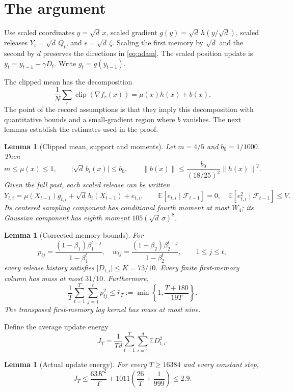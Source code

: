 \documentclass[11pt]{article}
\newtheorem{lemma}[theorem]{Lemma}
\newcommand{\E}{\mathbb E}
\newcommand{\norm}[1]{\left\|#1\right\|}
\newcommand{\clip}{\operatorname{clip}}
\begin{document}
\section{The argument}
Use scaled coordinates $y=\sqrt d\,x$, scaled gradient
$g(y)=\sqrt d\,h(y/\sqrt d)$, scaled releases $Y_t=\sqrt d\,Q_t$, and
$\epsilon=\sqrt d\,\zeta$. Scaling the first memory by $\sqrt d$ and the
second by $d$ preserves the directions in \eqref{eq:adam}.
The scaled position update is $y_t=y_{t-1}-\gamma D_t$.
Write $g_t=g(y_{t-1})$.

The clipped mean has the decomposition
\begin{equation}\label{eq:mean}
 \frac1N\sum_r\clip(\nabla f_r(x))=\mu(x)h(x)+b(x).
\end{equation}
The point of the record assumptions is that they imply this decomposition
with quantitative bounds and a small-gradient region where $b$ vanishes.
The next lemmas establish the estimates used in the proof.

\begin{lemma}[Clipped mean, support and moments]\label{lem:query}
Let $m=4/5$ and $b_0=1/1000$. Then
\[
 m\le\mu(x)\le1,\qquad
 \lvert\sqrt d\,b_i(x)\rvert\le b_0,\qquad
 \norm{b(x)}\le\frac{b_0}{(18/25)^2}\norm{h(x)}^2 .
\]
Given the full past, each scaled release can be written
\[
 Y_{t,i}=\mu(X_{t-1})g_{t,i}+\sqrt d\,b_i(X_{t-1})+e_{t,i},
 \qquad \E[e_{t,i}\mid\mathcal F_{t-1}]=0,\quad
 \E[e_{t,i}^2\mid\mathcal F_{t-1}]\le V.
\]
Its centered sampling component has conditional fourth moment at most $W_4$;
its Gaussian component has eighth moment $105(\sqrt d\,\sigma)^8$.
\end{lemma}

\begin{lemma}[Corrected memory bounds]\label{lem:weights}
For
\[
 p_{tj}=\frac{(1-\beta_1)\beta_1^{t-j}}{1-\beta_1^t},\quad
 w_{tj}=\frac{(1-\beta_2)\beta_2^{t-j}}{1-\beta_2^t},
 \qquad 1\le j\le t,
\]
every release history satisfies $\lvert D_{t,i}\rvert\le K=73/10$.
Every finite first-memory column has mass at most $31/10$.
Furthermore,
\[
 \frac1T\sum_{t=1}^T\sum_{j=1}^t p_{tj}^2
 \le\bar r_T:=\min\left\{1,\frac{T+180}{19T}\right\}.
\]
The transposed first-memory lag kernel has mass at most nine.
\end{lemma}

Define the average update energy
\[
 J_T=\frac1{Td}\sum_{t=1}^T\sum_{i=1}^d\E D_{t,i}^2 .
\]
\begin{lemma}[Actual update energy]\label{lem:energy}
For every $T\ge16384$ and every constant step,
\[
 J_T\le\frac{63K^2}{T}
       +1011\left(\frac{26}{T}+\frac1{999}\right)\le2.9.
\]
\end{lemma}
\end{document}
